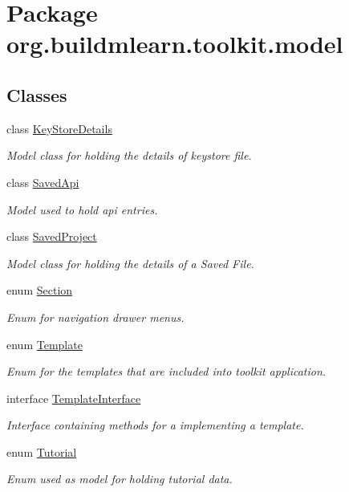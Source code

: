 \hypertarget{namespaceorg_1_1buildmlearn_1_1toolkit_1_1model}{}\section{Package org.\+buildmlearn.\+toolkit.\+model}
\label{namespaceorg_1_1buildmlearn_1_1toolkit_1_1model}
\subsection*{Classes}
\begin{DoxyCompactItemize}
\item 
class \hyperlink{classorg_1_1buildmlearn_1_1toolkit_1_1model_1_1KeyStoreDetails}{Key\+Store\+Details}
\begin{DoxyCompactList}\small\item\em Model class for holding the details of keystore file. \end{DoxyCompactList}\item 
class \hyperlink{classorg_1_1buildmlearn_1_1toolkit_1_1model_1_1SavedApi}{Saved\+Api}
\begin{DoxyCompactList}\small\item\em Model used to hold api entries. \end{DoxyCompactList}\item 
class \hyperlink{classorg_1_1buildmlearn_1_1toolkit_1_1model_1_1SavedProject}{Saved\+Project}
\begin{DoxyCompactList}\small\item\em Model class for holding the details of a Saved File. \end{DoxyCompactList}\item 
enum \hyperlink{enumorg_1_1buildmlearn_1_1toolkit_1_1model_1_1Section}{Section}
\begin{DoxyCompactList}\small\item\em Enum for navigation drawer menus. \end{DoxyCompactList}\item 
enum \hyperlink{enumorg_1_1buildmlearn_1_1toolkit_1_1model_1_1Template}{Template}
\begin{DoxyCompactList}\small\item\em Enum for the templates that are included into toolkit application. \end{DoxyCompactList}\item 
interface \hyperlink{interfaceorg_1_1buildmlearn_1_1toolkit_1_1model_1_1TemplateInterface}{Template\+Interface}
\begin{DoxyCompactList}\small\item\em Interface containing methods for a implementing a template. \end{DoxyCompactList}\item 
enum \hyperlink{enumorg_1_1buildmlearn_1_1toolkit_1_1model_1_1Tutorial}{Tutorial}
\begin{DoxyCompactList}\small\item\em Enum used as model for holding tutorial data. \end{DoxyCompactList}\end{DoxyCompactItemize}
